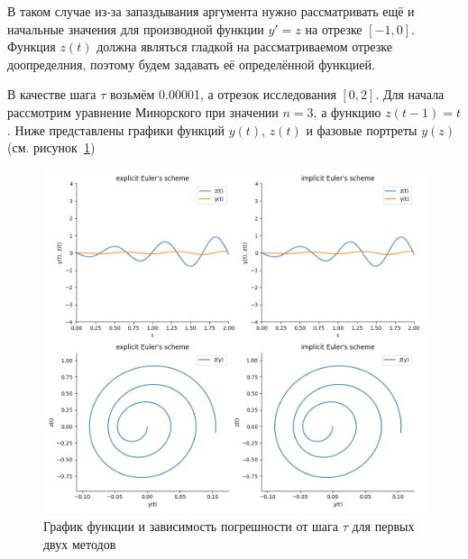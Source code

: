 \documentclass[a4paper,12pt]{article}
\begin{document}
	В таком случае из-за запаздывания аргумента нужно рассматривать ещё 
	и начальные значения для производной функции $y' = z$ на отрезке $[-1, 0]$.
	Функция $z(t)$ должна являться гладкой на рассматриваемом отрезке доопределния,
	поэтому будем задавать её определённой функцией.

	В качестве шага $\tau$ возьмём 0.00001, а отрезок исследования $[0, 2]$. 
	Для начала рассмотрим уравнение Минорского при значении $n = 3$, а функцию 
	$z(t-1) = t$. 
	Ниже представлены графики функций $y(t)$, $z(t)$ и фазовые портреты $y(z)$
	(см. рисунок~\ref{fig:fig3})

	\begin{figure}[ht!]
		\begin{center}
		\includegraphics[scale=0.38]{figures/Figure_worked2.png}
		\end{center}
		\vspace*{-8mm}
		\caption{График функции и зависимость погрешности от шага $\tau$ для первых двух методов}\label{fig:fig3}
  	\end{figure}
\end{document}

